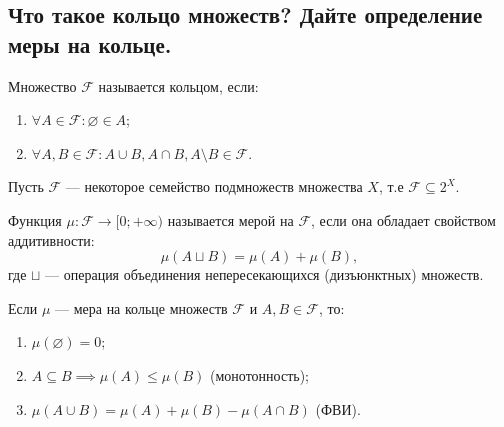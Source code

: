 
\subsection{Что такое кольцо множеств? Дайте определение меры на кольце.}

\begin{definition}[Маевский]
    Множество $\mathcal{F}$ называется кольцом, если:\\[-25 pt]
    \begin{enumerate}
        \item $\forall A \in \mathcal{F} : \varnothing \in A$;
        \item $\forall A,  B \in \mathcal{F} : A \cup B, A \cap B, A \setminus B \in \mathcal{F}$.
    \end{enumerate}
\end{definition}

\begin{definition}
    Пусть $\mathcal{F}$ --- некоторое семейство подмножеств множества $X$, т.е $\mathcal{F} \subseteq 2^X$.
            
    Функция $\mu : \mathcal{F} \to [0; +\infty)$ называется мерой на $\mathcal{F}$, 
    если она обладает свойством аддитивности:
    \[ \mu(A \sqcup B) = \mu(A) + \mu(B), \]
    где $\sqcup$ --- операция объединения непересекающихся (дизъюнктных) множеств.
\end{definition}

\begin{properties}
    Если $\mu$ --- мера на кольце множеств $\mathcal{F}$ и $A, B \in \mathcal{F}$, то:\\[-25 pt]
    \begin{enumerate}
        \item $\mu(\varnothing) = 0$;
        \item $A \subseteq B \implies \mu(A) \le \mu(B)$ (монотонность);
        \item $\mu(A \cup B) = \mu(A) + \mu(B) - \mu(A \cap B)$ (ФВИ).
    \end{enumerate}
\end{properties}
